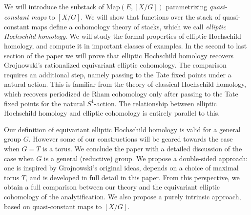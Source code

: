 \documentclass[11pt,letterpaper]{amsart}
\newcommand{\Map}[2]{\underline{\mathrm{Map}}\left (#1,#2\right )}
\begin{document}
 We will introduce the  
 substack  of $
\Map{E}{[X/G]}
$ parametrizing \emph{quasi-constant maps}  
to $[X/G]$. We will show that functions over the stack of quasi-constant maps define a  cohomology theory of stacks, which we call \emph{elliptic Hochschild homology}.  We will study the formal properties of elliptic Hochschild homology, and compute it in important classes of examples.  
In the second to last section of the paper we will prove that  elliptic Hochschild homology recovers Grojnowski's rationalized  equivariant elliptic cohomology. The comparison  requires  an additional step, namely passing to the Tate fixed points under a natural action.  This  is familiar from the theory of classical Hochschild homology, which recovers periodized de Rham cohomology only    after passing to the Tate fixed points for the natural  $S^1$-action. The relationship between elliptic Hochschild homology and elliptic cohomology is entirely parallel to this.  

Our definition of equivariant elliptic Hochschild homology is valid  for a general group $G$. However some of our constructions will be geared towards the case when $G=T$ is a torus. We conclude the paper with a detailed discussion of the case when $G$ is a general (reductive) group. We propose a double-sided approach: one is inspired by Grojnowski's original ideas, depends on a choice of maximal torus $T$, and is developed in full detail in this paper. From this perspective, we obtain a full comparison between our theory and the equivariant elliptic cohomology of the analytification. We also propose a purely intrinsic approach, based on quasi-constant maps to $[X/G]$. %



 
\end{document}
